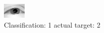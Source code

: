 \begin{figure}[h!]
\begin{center}
\includegraphics[width=0.60\columnwidth]{figures/ID2367_class_1_target_2.png}
\end{center}
\caption{ Classification: 1 actual target: 2}
\label{fig:ID2367_class_1_target_2}
\end{figure}
